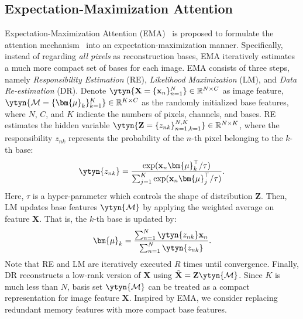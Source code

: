 \subsection{Expectation-Maximization Attention}
Expectation-Maximization Attention (EMA)~\cite{Li_2019_ICCV} is proposed to formulate the attention mechanism~\cite{nonlocal} into an expectation-maximization manner. Specifically, instead of regarding \emph{all pixels} as reconstruction bases, EMA iteratively estimates a much more compact set of bases for each image. EMA consists of three steps, namely \textit{Responsibility Estimation} (RE), \textit{Likelihood Maximization} (LM), and \textit{Data Re-estimation} (DR). Denote $\ytyn{\mathbf{X}=\{\mathbf{x}_n\}_{n=1}^{N}}\in \mathbb{R}^{N\times C}$ as image feature, $\ytyn{\mathcal{M}=\{\bm{\mu}_k\}_{k=1}^K}\in \mathbb{R}^{K\times C}$ as the randomly initialized base features, where $N$, $C$, and $K$ indicate the numbers of pixels, channels, and bases. RE estimates the hidden variable $\ytyn{\mathbf{Z} = \{z_{nk}\}_{n=1,k=1}^{N,K}}\in \mathbb{R}^{N\times K}$, where the responsibility $z_{nk}$ represents the probability of the $n$-th pixel belonging to the $k$-th base:
\vspace{-0.2cm}
	\begin{equation}
	\begin{split}
	 \ytyn{z_{nk}}=\frac{\exp(\mathbf{x}_{n}\bm{\mu}^{\top}_{k}/\tau)}{\sum_{j=1}^{K}\exp(\mathbf{x}_{n}\bm{\mu}^{\top}_{j}/\tau)}.
	\end{split}
	\label{eq:EMA_AE}
	\end{equation}
Here, $\tau$ is a hyper-parameter which controls the shape of distribution $\mathbf{Z}$. Then, LM updates base features $\ytyn{\mathcal{M}}$ by applying the weighted average on feature $\mathbf{X}$. That is, the $k$-th base is updated by:
\vspace{-0.2cm}
\begin{equation}
 \bm{\mu}_{k} = \frac{\sum^{N}_{n=1}\ytyn{z_{nk}}\mathbf{x}_{n}} {\sum^{N}_{n=1}\ytyn{z_{nk}}}.
 \label{eq:EMA_AM}
\end{equation}
Note that RE and LM are iteratively executed $R$ times until convergence. Finally, {DR} reconstructs a low-rank version of $\mathbf{X}$ using $\tilde{\mathbf{X}}=
\mathbf{Z}\ytyn{\mathcal{M}}$. Since $K$ is much less than $N$, basis set $\ytyn{\mathcal{M}}$ can be treated as a compact representation for image feature $\mathbf{X}$. Inspired by EMA, {we} consider replacing redundant memory features with more compact base features. 


